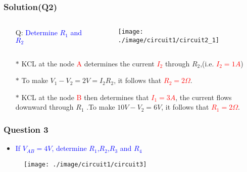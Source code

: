 \documentclass{beamer}
\newcommand{\blue}[1]{\textcolor{blue}{#1}}
\newcommand{\red}[1]{\textcolor{red}{#1}}
\begin{document}
\begin{frame}
\frametitle{Solution(Q2)}
\begin{columns}
\begin{column}{6cm}
\begin{itemize} \itemsep1pt \parskip0pt 
  \item[Q:] \blue{Determine $R_1$ and $R_2$}
\end{itemize}
\end{column}

\begin{column}{6cm}
\begin{figure}[H]
  \label{epi_circuit2_1}
  \centering
  \texttt{[image: ./image/circuit1/circuit2\_1]}
\end{figure}
\end{column}
\end{columns}

\begin{itemize} \itemsep1pt \parskip0pt 
  \item[$\ast$]KCL at the node \red{A} determines the current \red{$I_2$} through $R_2$,(i.e. \red{$I_2 = 1A$})\item[$\ast$] To make $V_1-V_2 = 2V = I_2R_2$, it follows that \red{$R_2 = 2\Omega$}.
  \item[$\ast$]KCL at the node \red{B} then determines that \red{$I_1 = 3A$}, the current flows downward through $R_1$ .\newline To make $10V-V_2 = 6V$, it follows that \red{$R_1 = 2\Omega$}.
\end{itemize}

\end{frame}


\begin{frame}
\frametitle{Question 3}

\begin{itemize} \itemsep1pt \parskip0pt 
  \item \blue{If $V_{AB} = 4V$, determine $R_1$,$R_2$,$R_3$ and $R_4$}
\end{itemize}



\begin{figure}[H]
  \label{epi_circuit3}
  \centering
  \texttt{[image: ./image/circuit1/circuit3]}
\end{figure}


\end{frame}
\end{document}
